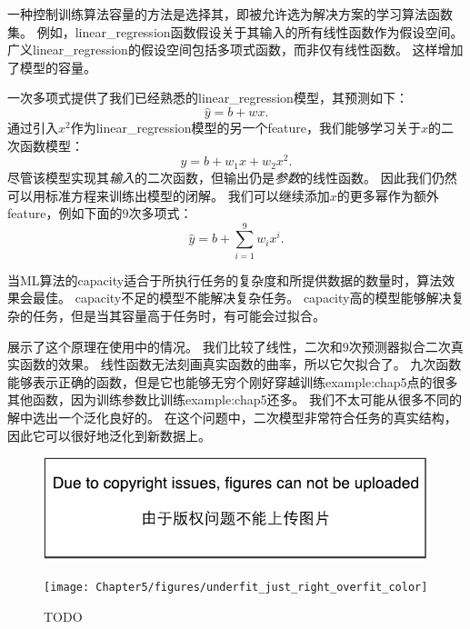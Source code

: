 一种控制训练算法容量的方法是选择其，即被允许选为解决方案的学习算法函数集。
例如，\gls{linear_regression}函数假设关于其输入的所有线性函数作为假设空间。
广义\gls{linear_regression}的假设空间包括多项式函数，而非仅有线性函数。
这样增加了模型的容量。

一次多项式提供了我们已经熟悉的\gls{linear_regression}模型，其预测如下：
\begin{equation}
    \hat{y} = b + wx.
\end{equation}
通过引入$x^2$作为\gls{linear_regression}模型的另一个\gls{feature}，我们能够学习关于$x$的二次函数模型：
\begin{equation}
    \hat{y} = b + w_1x + w_2x^2.
\end{equation}
尽管该模型实现其\emph{输入}的二次函数，但输出仍是\emph{参数}的线性函数。
因此我们仍然可以用标准方程来训练出模型的闭解。
我们可以继续添加$x$的更多幂作为额外\gls{feature}，例如下面的$9$次多项式：
\begin{equation}
    \hat{y} = b + \sum_{i=1}^9 w_i x^i.
\end{equation}

当\gls{ML}算法的\gls{capacity}适合于所执行任务的复杂度和所提供数据的数量时，算法效果会最佳。
\gls{capacity}不足的模型不能解决复杂任务。
\gls{capacity}高的模型能够解决复杂的任务，但是当其容量高于任务时，有可能会过拟合。

展示了这个原理在使用中的情况。
我们比较了线性，二次和$9$次预测器拟合二次真实函数的效果。
线性函数无法刻画真实函数的曲率，所以它欠拟合了。
九次函数能够表示正确的函数，但是它也能够无穷个刚好穿越训练\gls{example:chap5}点的很多其他函数，因为训练参数比训练\gls{example:chap5}还多。
我们不太可能从很多不同的解中选出一个泛化良好的。
在这个问题中，二次模型非常符合任务的真实结构，因此它可以很好地泛化到新数据上。

\begin{figure}[!htb]
\ifOpenSource
\centerline{\includegraphics{figure.pdf}}
\else
\centerline{\texttt{[image: Chapter5/figures/underfit\_just\_right\_overfit\_color]}}
\fi
\caption{TODO}
\label{fig:chap5_underfit_just_right_overfit}
\end{figure}

